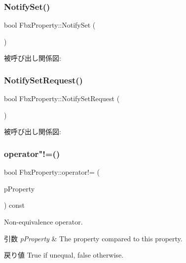 \subsubsection{\texorpdfstring{Notify\+Set()}{NotifySet()}}
{\footnotesize\ttfamily bool Fbx\+Property\+::\+Notify\+Set (\begin{DoxyParamCaption}{ }\end{DoxyParamCaption})\hspace{0.3cm}{\ttfamily [protected]}}

被呼び出し関係図\+:
\mbox{\label{class_fbx_property_afb12acf8aeec609f4df77c61e5346e59}} 
\subsubsection{\texorpdfstring{Notify\+Set\+Request()}{NotifySetRequest()}}
{\footnotesize\ttfamily bool Fbx\+Property\+::\+Notify\+Set\+Request (\begin{DoxyParamCaption}{ }\end{DoxyParamCaption})\hspace{0.3cm}{\ttfamily [protected]}}

被呼び出し関係図\+:
\mbox{\label{class_fbx_property_a78e06f51d52af04ffef695e3dd795659}} 
\subsubsection{\texorpdfstring{operator"!=()}{operator!=()}\hspace{0.1cm}{\footnotesize\ttfamily [1/2]}}
{\footnotesize\ttfamily bool Fbx\+Property\+::operator!= (\begin{DoxyParamCaption}\item[{const \hyperlink{class_fbx_property}{Fbx\+Property} \&}]{p\+Property }\end{DoxyParamCaption}) const}

Non-\/equivalence operator. 
\begin{DoxyParams}{引数}
{\em p\+Property} & The property compared to this property. \\
\hline
\end{DoxyParams}
\begin{DoxyReturn}{戻り値}
{\ttfamily True} if unequal, {\ttfamily false} otherwise. 
\end{DoxyReturn}
\mbox{\label{class_fbx_property_a9cb24dd197f19e6d1cc8dad2b757dce0}} 
